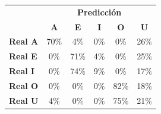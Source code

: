 \begin{tabular}{lccccc}
\toprule
 & \multicolumn{5}{c}{\textbf{Predicción}} \\
 & \textbf{A} & \textbf{E} & \textbf{I} & \textbf{O} & \textbf{U} \\
\midrule
\textbf{Real A} & \cellcolor[rgb]{0.51,0.51,1.00} \color{white} 70\% & \cellcolor[rgb]{0.97,0.97,1.00}  4\% & \cellcolor[rgb]{1.00,1.00,1.00}  0\% & \cellcolor[rgb]{1.00,1.00,1.00}  0\% & \cellcolor[rgb]{0.82,0.82,1.00}  26\% \\
\textbf{Real E} & \cellcolor[rgb]{1.00,1.00,1.00}  0\% & \cellcolor[rgb]{0.50,0.50,1.00} \color{white} 71\% & \cellcolor[rgb]{0.97,0.97,1.00}  4\% & \cellcolor[rgb]{1.00,1.00,1.00}  0\% & \cellcolor[rgb]{0.82,0.82,1.00}  25\% \\
\textbf{Real I} & \cellcolor[rgb]{1.00,1.00,1.00}  0\% & \cellcolor[rgb]{0.48,0.48,1.00} \color{white} 74\% & \cellcolor[rgb]{0.94,0.94,1.00}  9\% & \cellcolor[rgb]{1.00,1.00,1.00}  0\% & \cellcolor[rgb]{0.88,0.88,1.00}  17\% \\
\textbf{Real O} & \cellcolor[rgb]{1.00,1.00,1.00}  0\% & \cellcolor[rgb]{1.00,1.00,1.00}  0\% & \cellcolor[rgb]{1.00,1.00,1.00}  0\% & \cellcolor[rgb]{0.43,0.43,1.00} \color{white} 82\% & \cellcolor[rgb]{0.87,0.87,1.00}  18\% \\
\textbf{Real U} & \cellcolor[rgb]{0.97,0.97,1.00}  4\% & \cellcolor[rgb]{1.00,1.00,1.00}  0\% & \cellcolor[rgb]{1.00,1.00,1.00}  0\% & \cellcolor[rgb]{0.48,0.48,1.00} \color{white} 75\% & \cellcolor[rgb]{0.85,0.85,1.00}  21\% \\
\bottomrule
\end{tabular}